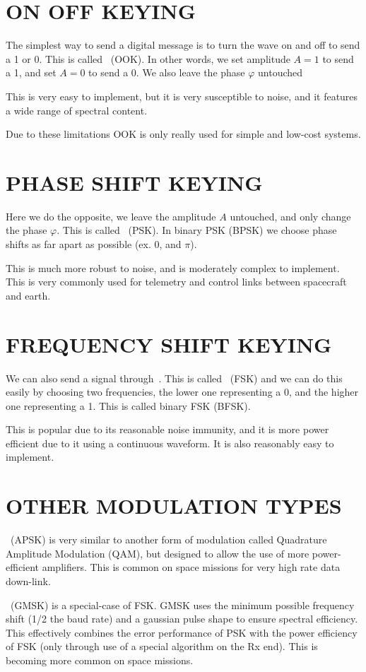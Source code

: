 \documentclass[]{report}
\newcommand{\keyword}[1]{{{\color{green}{#1}\,}}}
\begin{document}
	\section{ON OFF KEYING}
	The simplest way to send a digital message is to turn the wave on and off to send a 1 or 0. This is called \keyword{on-off-keying} (OOK). In other words, we set amplitude $A=1$ to send a 1, and set $A=0$ to send a 0. We also leave the phase $\varphi$ untouched
	
	This is very easy to implement, but it is very susceptible to noise, and it features a wide range of spectral content.
	
	Due to these limitations OOK is only really used for simple and low-cost systems.
	
	\section{PHASE SHIFT KEYING}
	
	Here we do the opposite, we leave the amplitude $A$ untouched, and only change the phase $\varphi$.
	This is called \keyword{phase-shift-keying} (PSK). In binary PSK (BPSK) we choose phase shifts as far apart as possible (ex. 0, and $\pi$).
	
	This is much more robust to noise, and is moderately complex to implement. This is very commonly used for telemetry and control links between spacecraft and earth.
	
	\section{FREQUENCY SHIFT KEYING}
	
	We can also send a signal through \keyword{frequency modulation}. This is called \keyword{frequency-shift-keying} (FSK) and we can do this easily by choosing two frequencies, the lower one representing a 0, and the higher one representing a 1. This is called binary FSK (BFSK).
	
	This is popular due to its reasonable noise immunity, and it is more power efficient due to it using a continuous waveform. It is also reasonably easy to implement.
	
	\section{OTHER MODULATION TYPES}
	
	\keyword{Amplitude Phase Shift Keying} (APSK) is very similar to another form of modulation called Quadrature Amplitude Modulation (QAM), but designed to allow the use of more power-efficient amplifiers. This is common on space missions for very high rate data down-link.
	
	\keyword{Guassian Minimum Shift Keying} (GMSK) is a special-case of FSK. GMSK uses the minimum possible frequency shift (1/2 the baud rate) and a gaussian pulse shape to ensure spectral efficiency. This effectively combines the error performance of PSK with the power efficiency of FSK (only through use of a special algorithm on the Rx end). This is becoming more common on space missions.
	
	
\end{document}
